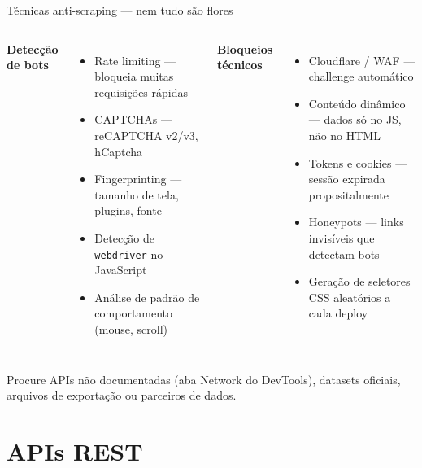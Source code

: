 \documentclass[xcolor=dvipsnames,t,aspectratio=169]{beamer}
\newcommand{\highlight}[1]{{\color{nes_dark_orange} #1}}
\begin{document}
\begin{frame}[c]{Técnicas anti-scraping — nem tudo são flores}

\begin{columns}
\textbf{\color{nes_dark_purple}Detecção de bots}
\begin{itemize}
    \item \highlight{Rate limiting} — bloqueia muitas requisições rápidas
    \item \highlight{CAPTCHAs} — reCAPTCHA v2/v3, hCaptcha
    \item \highlight{Fingerprinting} — tamanho de tela, plugins, fonte
    \item Detecção de \texttt{webdriver} no JavaScript
    \item Análise de padrão de comportamento (mouse, scroll)
\end{itemize}

\textbf{\color{nes_dark_purple}Bloqueios técnicos}
\begin{itemize}
    \item \highlight{Cloudflare / WAF} — challenge automático
    \item \highlight{Conteúdo dinâmico} — dados só no JS, não no HTML
    \item \highlight{Tokens e cookies} — sessão expirada propositalmente
    \item \highlight{Honeypots} — links invisíveis que detectam bots
    \item Geração de seletores CSS aleatórios a cada deploy
\end{itemize}
\end{columns}

\begin{display}
Procure APIs não documentadas (aba Network do DevTools), datasets oficiais, arquivos de exportação ou parceiros de dados. 
\end{display}

\end{frame}


\section{APIs REST}
\end{document}
